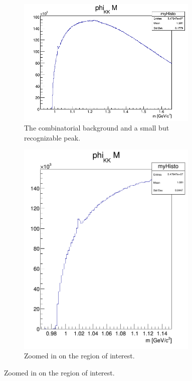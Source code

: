 \documentclass[a4paper,12pt]{article}
\begin{document}
\begin{figure}[H]
	\centering
	\begin{subfigure}{0.49\textwidth}
		\centering
		\includegraphics[width=0.95\textwidth]{phi_KK_M.png}
		\caption{ The combinatorial background and a small but recognizable peak. }
	\end{subfigure}
	\begin{subfigure}{0.49\textwidth}
		\centering
		\includegraphics[width=0.95\textwidth]{phi_KK_Mzoom.png}
		\caption{ Zoomed in on the region of interest. }
	\end{subfigure}
\end{figure}
\end{document}
